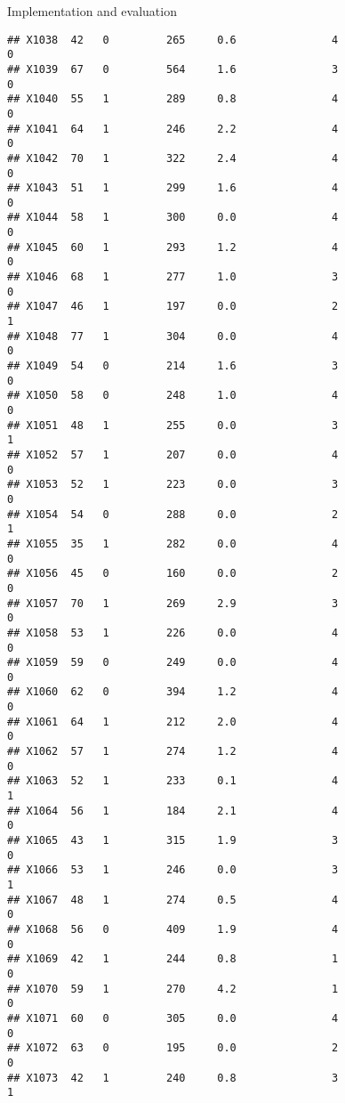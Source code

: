 \documentclass[
  ignorenonframetext,
]{beamer}
\begin{document}
\begin{frame}[fragile]{Implementation and evaluation}
\begin{verbatim}
## X1038  42   0         265     0.6               4                   0
## X1039  67   0         564     1.6               3                   0
## X1040  55   1         289     0.8               4                   0
## X1041  64   1         246     2.2               4                   0
## X1042  70   1         322     2.4               4                   0
## X1043  51   1         299     1.6               4                   0
## X1044  58   1         300     0.0               4                   0
## X1045  60   1         293     1.2               4                   0
## X1046  68   1         277     1.0               3                   0
## X1047  46   1         197     0.0               2                   1
## X1048  77   1         304     0.0               4                   0
## X1049  54   0         214     1.6               3                   0
## X1050  58   0         248     1.0               4                   0
## X1051  48   1         255     0.0               3                   1
## X1052  57   1         207     0.0               4                   0
## X1053  52   1         223     0.0               3                   0
## X1054  54   0         288     0.0               2                   1
## X1055  35   1         282     0.0               4                   0
## X1056  45   0         160     0.0               2                   0
## X1057  70   1         269     2.9               3                   0
## X1058  53   1         226     0.0               4                   0
## X1059  59   0         249     0.0               4                   0
## X1060  62   0         394     1.2               4                   0
## X1061  64   1         212     2.0               4                   0
## X1062  57   1         274     1.2               4                   0
## X1063  52   1         233     0.1               4                   1
## X1064  56   1         184     2.1               4                   0
## X1065  43   1         315     1.9               3                   0
## X1066  53   1         246     0.0               3                   1
## X1067  48   1         274     0.5               4                   0
## X1068  56   0         409     1.9               4                   0
## X1069  42   1         244     0.8               1                   0
## X1070  59   1         270     4.2               1                   0
## X1071  60   0         305     0.0               4                   0
## X1072  63   0         195     0.0               2                   0
## X1073  42   1         240     0.8               3                   1

\end{verbatim}
\end{frame}
\end{document}
